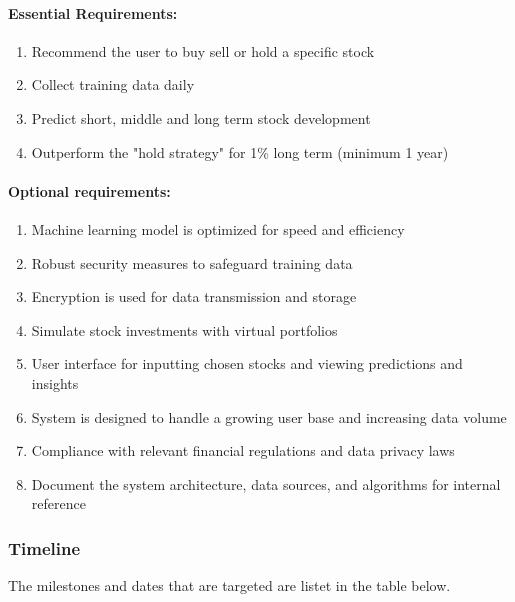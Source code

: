 \paragraph{Essential Requirements:}
\begin{enumerate}
	\item Recommend the user to buy sell or hold a specific stock
	\item Collect training data daily
	\item Predict short, middle and long term stock development
	\item Outperform the "hold strategy" for 1\% long term (minimum 1 year)
\end{enumerate}

\paragraph{Optional requirements:}

\begin{enumerate}
	\item Machine learning model is optimized for speed and efficiency
	\item Robust security measures to safeguard training data
	\item Encryption is used for data transmission and storage
	\item Simulate stock investments with virtual portfolios
	\item User interface for inputting chosen stocks and viewing predictions and insights
	\item System is designed to handle a growing user base and increasing data volume
	\item Compliance with relevant financial regulations and data privacy laws
	\item Document the system architecture, data sources, and algorithms for internal reference
\end{enumerate}


\clearpage
\subsubsection{Timeline}\label{Timeline}
The milestones and dates that are targeted are listet in the table below.

